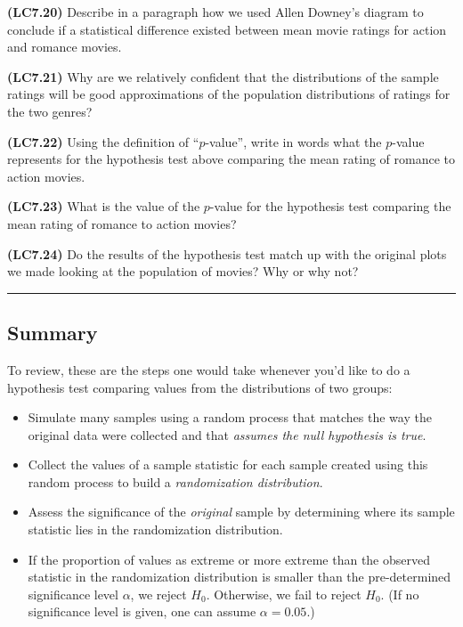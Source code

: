 \documentclass[]{tufte-book}
\let\oldrule=\rule
\renewcommand{\rule}[1]{\oldrule{\linewidth}}
\theoremstyle{definition}
\theoremstyle{definition}
\theoremstyle{remark}
\begin{document}
\textbf{(LC7.20)} Describe in a paragraph how we used Allen Downey's
diagram to conclude if a statistical difference existed between mean
movie ratings for action and romance movies.

\textbf{(LC7.21)} Why are we relatively confident that the distributions
of the sample ratings will be good approximations of the population
distributions of ratings for the two genres?

\textbf{(LC7.22)} Using the definition of ``\(p\)-value'', write in
words what the \(p\)-value represents for the hypothesis test above
comparing the mean rating of romance to action movies.

\textbf{(LC7.23)} What is the value of the \(p\)-value for the
hypothesis test comparing the mean rating of romance to action movies?

\textbf{(LC7.24)} Do the results of the hypothesis test match up with
the original plots we made looking at the population of movies? Why or
why not?

\begin{center}\rule{0.5\linewidth}{\linethickness}\end{center}

\subsection{Summary}\label{summary-5}

To review, these are the steps one would take whenever you'd like to do
a hypothesis test comparing values from the distributions of two groups:

\begin{itemize}
\item
  Simulate many samples using a random process that matches the way the
  original data were collected and that \emph{assumes the null
  hypothesis is true}.
\item
  Collect the values of a sample statistic for each sample created using
  this random process to build a \emph{randomization distribution}.
\item
  Assess the significance of the \emph{original} sample by determining
  where its sample statistic lies in the randomization distribution.
\item
  If the proportion of values as extreme or more extreme than the
  observed statistic in the randomization distribution is smaller than
  the pre-determined significance level \(\alpha\), we reject \(H_0\).
  Otherwise, we fail to reject \(H_0\). (If no significance level is
  given, one can assume \(\alpha = 0.05\).)
\end{itemize}
\end{document}

